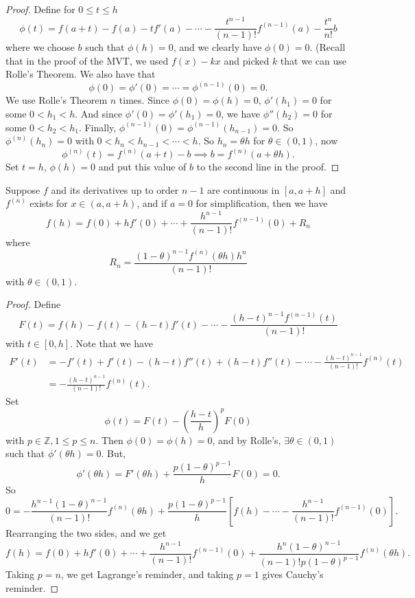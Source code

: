 \begin{proof}
    Define for \(0 \leq t \leq h\)
    \[
        \phi(t) = f(a + t) - f(a) - tf'(a) - \cdots -\frac{t^{n-1}}{(n-1)!}f^{(n-1)}(a) - \frac{t^n}{n!}b
    \]
    where we choose \(b\) such that \(\phi(h) = 0\), and we clearly have \(\phi(0) = 0\). (Recall that in the proof of the MVT, we used \(f(x) - kx\) and picked \(k\) that we can use Rolle's Theorem. We also have that
    \[\phi(0) = \phi'(0) = \cdots = \phi^{(n-1)}(0) = 0.\] We use Rolle's Theorem \(n\) times. Since \(\phi(0) = \phi(h) = 0\), \(\phi'(h_1) = 0\) for some \(0 < h_1 < h\). And since \(\phi'(0) = \phi'(h_1) = 0\), we have \(\phi''(h_2) = 0\) for some \(0 < h_2 < h_1\). Finally, \(\phi^{(n-1)}(0) = \phi^{(n-1)}(h_{n-1}) = 0\). So \(\phi^{(n)}(h_n)=0\) with \(0<h_n < h_{n-1} < \cdots < h\). So \(h_n = \theta h\) for \(\theta \in (0,1)\), now
    \[
        \phi^{(n)}(t) = f^{(n)}(a + t) - b \implies b = f^{(n)}(a + \theta h).
    \]
    Set \(t = h\), \(\phi(h) = 0\) and put this value of \(b\) to the second line in the proof.
\end{proof}
\begin{theorem}
    Suppose \(f\) and its derivatives up to order \(n - 1\) are continuous in \([a, a + h]\) and \(f^{(n)}\) exists for \(x \in (a, a + h)\), and if \(a = 0\) for simplification, then we have
    \[
        f(h) = f(0) + hf'(0) + \cdots + \frac{h^{n-1}}{(n-1)!}f^{(n-1)}(0) + R_n
    \]
    where
    \[
        R_n = \frac{(1-\theta)^{n-1}f^{(n)}(\theta h)h^n}{(n-1)!}
    \]
    with \(\theta \in (0,1)\).
\end{theorem}
\begin{proof}
    Define
    \[
        F(t) = f(h) - f(t) - (h-t)f'(t) - \cdots - \frac{(h-t)^{n-1}f^{(n-1)}(t)}{(n-1)!}
    \]
    with \(t \in [0,h]\). Note that we have
    \begin{align*}
        F'(t) &= -f'(t) + f'(t) - (h-t)f''(t) + (h-t)f''(t) - \cdots -\frac{(h-t)^{n-1}}{(n-1)!}f^{(n)}(t)\\
        &= -\frac{(h-t)^{n-1}}{(n-1)!}f^{(n)}(t).
    \end{align*}
    Set
    \[
        \phi(t) = F(t) - (\frac{h - t}{h})^{p}F(0)
    \]
    with \(p \in \mathbb{Z}, 1 \leq p \leq n\). Then \(\phi(0) = \phi(h) = 0\), and by Rolle's, \(\exists \theta \in (0,1)\) such that \(\phi'(\theta h) = 0\). But,
    \[
        \phi'(\theta h) = F'(\theta h) + \frac{p(1-\theta)^{p-1}}{h}F(0) = 0.
    \]
    So
    \[
        0 = -\frac{h^{n-1}(1-\theta)^{n-1}}{(n-1)!}f^{(n)}(\theta h)+\frac{p(1-\theta)^{p-1}}{h}[f(h) - \cdots - \frac{h^{n-1}}{(n-1)!}f^{(n-1)}(0)].
    \]
    Rearranging the two sides, and we get
    \[
        f(h) = f(0) + hf'(0) + \cdots + \frac{h^{n-1}}{(n-1)!}f^{(n-1)}(0) + \frac{h^n(1-\theta)^{n-1}}{(n-1)!p(1-\theta)^{p-1}}f^{(n)}(\theta h).
    \]
    Taking \(p = n\), we get Lagrange's reminder, and taking \(p = 1\) gives Cauchy's reminder.
\end{proof}